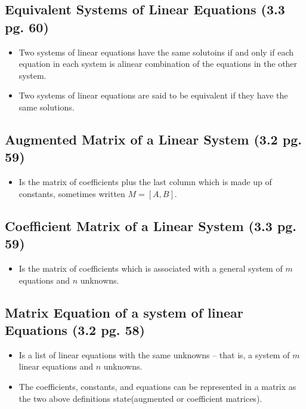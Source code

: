 \documentclass[hidelinks, 11pt, openleft]{scrartcl}
\begin{document}
\subsection*{Equivalent Systems of Linear Equations (3.3 pg. 60)}
\begin{itemize}
    \item Two systems of linear equations have the same solutoins if and only if each equation in each system is alinear combination of the equations in the other system.
    \item Two systems of linear equations are said to be equivalent if they have the same solutions. 
\end{itemize}

\subsection*{Augmented Matrix of a Linear System (3.2 pg. 59)}
\begin{itemize}
    \item Is the matrix of coefficients plus the last column which is made up of constants, sometimes written $M=[A,B]$.
\end{itemize}

\subsection*{Coefficient Matrix of a Linear System (3.3 pg. 59)}
\begin{itemize}
    \item Is the matrix of coefficients which is associated with a general system of $m$ equations and $n$ unknowns.
\end{itemize}

\subsection*{Matrix Equation of a system of linear Equations (3.2 pg. 58)}
\begin{itemize}
    \item Is a list of linear equations with the same unknowns -- that is, a system of $m$ linear equations and $n$ unknowns.
    \item The coefficients, constants, and equations can be represented in a matrix as the two above definitions state(augmented or coefficient matrices).
\end{itemize}
\end{document}
